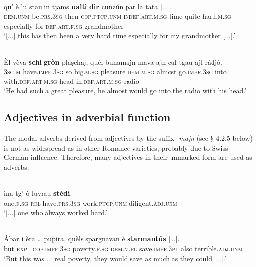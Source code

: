 \ea\label{}
\\
\gll [...] qu’ è lu stau in tjams \textbf{ualti} \textbf{dir} cunzún par la tata [...]. \\
{} \textsc{dem.unm} be.\textsc{prs.3sg} then \textsc{cop.ptcp.unm} \textsc{indef.art.m.sg} time quite hard.\textsc{m.sg} especially for \textsc{def.art.f.sg} grandmother \\
\glt `[...] this has then been a very hard time especially for my grandmother [...].'
\z

\ea
\label{}
\\
\gll    Èl vèva \textbf{schi} \textbf{gròn} plaṣchaj, quèl bunamajn mava ajn cul tgau ajl rádjò.\\
\textsc{3sg.m} have.\textsc{impf.3sg} so big.\textsc{m.sg} pleasure \textsc{dem.m.sg} almost go.\textsc{impf.3sg} into with.\textsc{def.art.m.sg} head in.\textsc{def.art.m.sg} radio\\
\glt `He had such a great pleasure, he almost would go into the radio with his head.'
\z


\subsection{Adjectives in adverbial function}
The modal adverbs derived from adjectives by the suffix -\textit{majn} (see § 4.2.5 below) is not as widespread as in other Romance varieties, probably due to Swiss German influence. Therefore, many adjectives in their unmarked form are used as adverbs.

\ea\label{}
\\
\gll [...] ina tg’ ò luvrau \textbf{stédi}.\\
{} one.\textsc{f.sg} \textsc{rel} have.\textsc{prs.3sg} work.\textsc{ptcp.unm} diligent.\textsc{adj.unm} \\
\glt `[...] one who always worked hard.'
\z

\ea\label{}
\\
\gll   Ábar i èra … pupira, quèls spargnavan è \textbf{starmantús} [...].\\
but \textsc{expl}  \textsc{cop.impf.3sg} {} poverty.\textsc{f.sg} \textsc{dem.m.pl} save.\textsc{impf.3pl} also terrible.\textsc{adj.unm}\\
\glt `But this was ... real poverty, they would save as much as they could [...].'
\z

